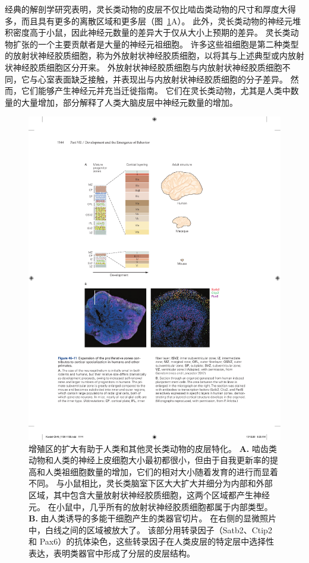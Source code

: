 经典的解剖学研究表明，灵长类动物的皮层不仅比啮齿类动物的尺寸和厚度大得多，而且具有更多的离散区域和更多层（图~\ref{fig:46_11}A）。
此外，灵长类动物的神经元堆积密度高于小鼠，因此神经元数量的差异大于仅从大小上预期的差异。
灵长类动物扩张的一个主要贡献者是大量的神经元祖细胞。
许多这些祖细胞是第二种类型的放射状神经胶质细胞，称为外放射状神经胶质细胞，以将其与上述典型或内放射状神经胶质细胞区分开来。
外放射状神经胶质细胞与内放射状神经胶质细胞不同，它与心室表面缺乏接触，并表现出与内放射状神经胶质细胞的分子差异。
然而，它们能够产生神经元并充当迁徙指南。
它们在灵长类动物，尤其是人类中数量的大量增加，部分解释了人类大脑皮层中神经元数量的增加。


\begin{figure}[htbp]
	\centering
	\includegraphics[width=0.9\linewidth]{chap46/fig_46_11}
	\caption{增殖区的扩大有助于人类和其他灵长类动物的皮层特化。
		\textbf{A.} 啮齿类动物和人类的神经上皮细胞大小最初都很小，但由于自我更新率的提高和人类祖细胞数量的增加，它们的相对大小随着发育的进行而显着不同。
		与小鼠相比，灵长类脑室下区大大扩大并细分为内部和外部区域，其中包含大量放射状神经胶质细胞，这两个区域都产生神经元。
		在小鼠中，几乎所有的放射状神经胶质细胞都属于内部类型\cite{giandomenico2017probing}。
		\textbf{B.} 由人类诱导的多能干细胞产生的类器官切片。
		在右侧的显微照片中，白线之间的区域被放大了。
		该部分用转录因子（Satb2、Ctip2 和 Pax6）的抗体染色，这些转录因子在人类皮层的特定层中选择性表达，表明类器官中形成了分层的皮层结构。}
	\label{fig:46_11}
\end{figure}


